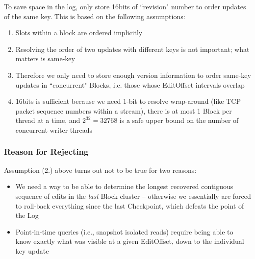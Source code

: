 \documentclass[11pt]{article}
\begin{document}
To save space in the log, only store 16bits of ``revision" number to
order updates of the same key.  This is based on the following
assumptions:

\begin{enumerate}
\item Slots within a block are ordered implicitly
\item Resolving the order of two updates with different keys is not
  important; what matters is same-key
\item Therefore we only need to store enough version information to
  order same-key updates in ``concurrent" Blocks, i.e. those whose
  EditOffset intervals overlap
\item 16bits is sufficient because we need 1-bit to resolve
  wrap-around (like TCP packet sequence numbers within a stream),
  there is at most 1 Block per thread at a time, and $2^{32}=32768$ is
  a safe upper bound on the number of concurrent writer threads
\end{enumerate}

\subsubsection{Reason for Rejecting}

Assumption (2.) above turns out not to be true for two reasons:

\begin{itemize}
\item[i.] We need a way to be able to determine the longest recovered
  contiguous sequence of edits in the \textit{last} Block cluster --
  otherwise we essentially are forced to roll-back everything since
  the last Checkpoint, which defeats the point of the Log
\item[ii.] Point-in-time queries (i.e., snapshot isolated reads)
  require being able to know exactly what was visible at a given
  EditOffset, down to the individual key update
\end{itemize}
\end{document}
